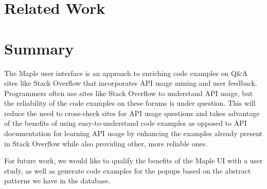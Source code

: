 \section{Related Work} 


\section{Summary}
\label{sec:summary}

The Maple user interface is an approach to enriching code examples on Q\&A sites like Stack Overflow that incorporates API usage mining and user feedback. Programmers often use sites like Stack Overflow to understand API usage, but the reliability of the code examples on these forums is under question. This will reduce the need to cross-check sites for API usage questions and takes advantage of the benefits of using easy-to-understand code examples as opposed to API documentation for learning API usage by enhancing the examples already present in Stack Overflow while also providing other, more reliable ones.

For future work, we would like to qualify the benefits of the Maple UI with a user study, as well as generate code examples for the popups based on the abstract patterns we have in the database.